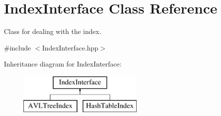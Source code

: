 \hypertarget{class_index_interface}{}\section{Index\+Interface Class Reference}
\label{class_index_interface}


Class for dealing with the index.  




{\ttfamily \#include $<$Index\+Interface.\+hpp$>$}

Inheritance diagram for Index\+Interface\+:\begin{figure}[H]
\begin{center}
\leavevmode
\includegraphics[height=2.000000cm]{class_index_interface}
\end{center}
\end{figure}

